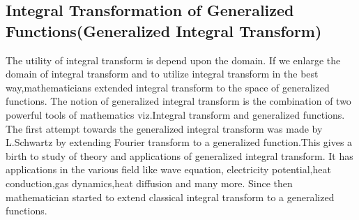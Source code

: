 \begin{large}
\section{Integral Transformation of Generalized Functions(Generalized Integral Transform)}
The utility of integral transform is depend upon the domain. If we enlarge the domain of integral transform and to utilize integral transform in the best way,mathematicians extended integral transform to the space of generalized functions. The notion of generalized integral transform is the combination of two powerful tools of mathematics viz.Integral transform and generalized functions. The first attempt towards the generalized integral transform was made by L.Schwartz\cite{R72,R73} by extending Fourier transform to a generalized function.This gives a birth to study of theory and applications of generalized integral transform. It has applications in the various field like wave equation, electricity potential\cite{R98},heat conduction\cite{R74},gas dynamics\cite{R40},heat diffusion\cite{R41} and many more. Since then mathematician started to extend classical integral transform to a generalized functions\cite{R60,R66}.


\end{large}
